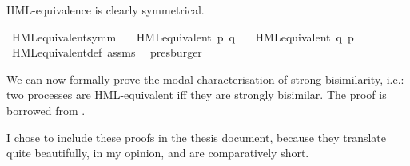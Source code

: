 \begin{isabellebody}
\begin{isamarkuptext}
HML-equivalence is clearly symmetrical.%
\end{isamarkuptext}\isamarkuptrue%
\isamarkupfalse%
\ HML{\isacharunderscore}{\kern0pt}equivalent{\isacharunderscore}{\kern0pt}symm{\isacharcolon}{\kern0pt}\isanewline
\ \ \ {\isacartoucheopen}HML{\isacharunderscore}{\kern0pt}equivalent\ p\ q{\isacartoucheclose}\isanewline
\ \ \ {\isacartoucheopen}HML{\isacharunderscore}{\kern0pt}equivalent\ q\ p{\isacartoucheclose}\isanewline
%
\isadelimproof
\ \ %
\endisadelimproof
%
\isatagproof
{}\isamarkupfalse%
\ HML{\isacharunderscore}{\kern0pt}equivalent{\isacharunderscore}{\kern0pt}def\ assms\ \isamarkupfalse%
\ presburger%
\endisatagproof
{\isafoldproof}%
%
\isadelimproof
%
\endisadelimproof
%
\begin{isamarkuptext}%
We can now formally prove the modal characterisation of strong bisimilarity, i.e.: two processes are HML-equivalent iff they are strongly bisimilar. The proof is borrowed from \cite[theorem 5.1]{reactivesystems}. 

I chose to include these proofs in the thesis document, because they translate quite beautifully, in my opinion, and are comparatively short.


\end{isamarkuptext}
\end{isabellebody}
